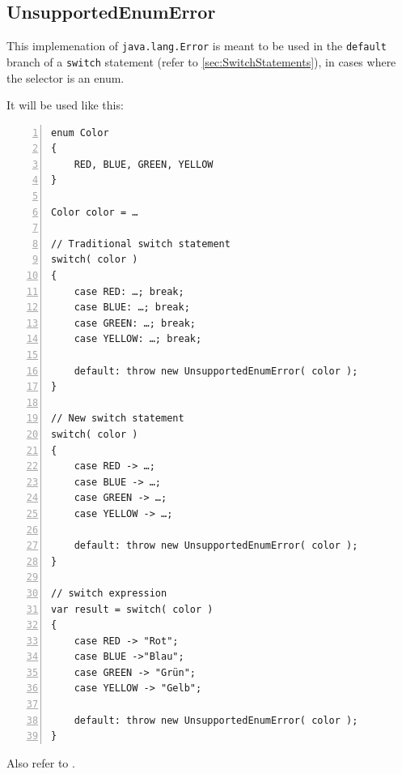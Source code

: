 \documentclass[12pt,a4paper,titlepage, parskip=half, headsepline, footsepline, cleardoubleplain]{scrbook}
\begin{document}
\subsection{UnsupportedEnumError}\label{sec:UnsupportedEnumError}
This implemenation of \lstinline|java.lang.Error| is meant to be used in the \lstinline|default| branch of a \lstinline|switch| statement (refer to \vref{sec:SwitchStatements}), in cases where the selector is an enum.

It will be used like this:
\begin{lstlisting}[numbers=left]
enum Color
{
    RED, BLUE, GREEN, YELLOW
}

Color color = …    

// Traditional switch statement
switch( color )
{
    case RED: …; break;
    case BLUE: …; break;
    case GREEN: …; break;
    case YELLOW: …; break;

    default: throw new UnsupportedEnumError( color );
}

// New switch statement
switch( color )
{
    case RED -> …;
    case BLUE -> …;
    case GREEN -> …;
    case YELLOW -> …;

    default: throw new UnsupportedEnumError( color );
}

// switch expression
var result = switch( color )
{
    case RED -> "Rot";
    case BLUE ->"Blau";
    case GREEN -> "Grün";
    case YELLOW -> "Gelb";

    default: throw new UnsupportedEnumError( color );
}
\end{lstlisting}

Also refer to \autocite{TQUADRAT_ORG_FOUNDATION_UNSUPPORTEDENUMERROR}.
\end{document}
